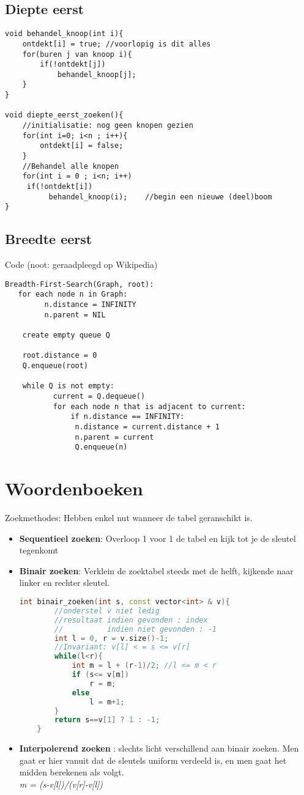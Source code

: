 \documentclass[11pt]{article}
\begin{document}
\subsection{Diepte eerst}
\begin{lstlisting}
void behandel_knoop(int i){
	ontdekt[i] = true; //voorlopig is dit alles
	for(buren j van knoop i){
		if(!ontdekt[j])
			behandel_knoop[j];
	}
}

void diepte_eerst_zoeken(){
	//initialisatie: nog geen knopen gezien
	for(int i=0; i<n ; i++){
		ontdekt[i] = false;
	}
	//Behandel alle knopen
	for(int i = 0 ; i<n; i++)
	 if(!ontdekt[i])
          behandel_knoop(i);	//begin een nieuwe (deel)boom
}
\end{lstlisting}
\subsection{Breedte eerst}
Code (noot: geraadpleegd op Wikipedia)
\begin{lstlisting}
Breadth-First-Search(Graph, root):
   for each node n in Graph:            
         n.distance = INFINITY        
         n.parent = NIL

	create empty queue Q      

    root.distance = 0
    Q.enqueue(root)                      
 
    while Q is not empty:        
           current = Q.dequeue()     
           for each node n that is adjacent to current:	
               if n.distance == INFINITY:
				n.distance = current.distance + 1
				n.parent = current
				Q.enqueue(n)
\end{lstlisting}
\section{Woordenboeken}
Zoekmethodes: Hebben enkel nut wanneer de tabel geranschikt is.
\begin{itemize}
	\item \textbf{Sequentieel zoeken}: Overloop 1 voor 1 de tabel en kijk tot je de sleutel tegenkomt
	\item \textbf{Binair zoeken}: Verklein de zoektabel steeds met de helft, kijkende naar linker en rechter sleutel.
	\begin{lstlisting}[language=C++,
                   directivestyle={\color{black}}
                   emph={int,char,double,float,unsigned},
                   emphstyle={\color{blue}}
                  ]
	int binair_zoeken(int s, const vector<int> & v){
		//onderstel v niet ledig
		//resultaat indien gevonden : index
		//          indien niet gevonden : -1
		int l = 0, r = v.size()-1;
		//Invariant: v[l] < = s <= v[r]
		while(l<r){
			int m = l + (r-1)/2; //l <= m < r
			if (s<= v[m])
				r = m;
			else
				l = m+1;
		}
		return s==v[1] ? 1 : -1;
	}
	\end{lstlisting}
	\item \textbf{Interpolerend zoeken} : slechts licht verschillend aan binair zoeken. Men gaat er hier vanuit dat de sleutels uniform verdeeld is, en men gaat het midden berekenen als volgt. \\
	 \emph{m = (s-v[l])/(v[r]-v[l])}
\end{itemize}
\end{document}
